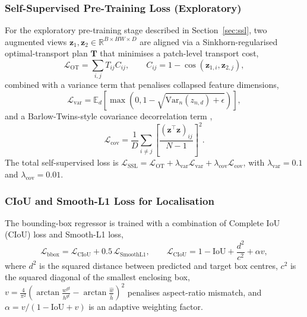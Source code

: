 \documentclass[preprint,12pt,authoryear]{elsarticle}
\begin{document}
\subsubsection{Self-Supervised Pre-Training Loss (Exploratory)}
\label{sec:loss-ssl}

For the exploratory pre-training stage described in Section~\ref{sec:ssl}, two augmented views $\mathbf{z}_1, \mathbf{z}_2 \in \mathbb{R}^{B\times HW \times D}$ are aligned via a Sinkhorn-regularised optimal-transport plan $\mathbf{T}$ that minimises a patch-level transport cost,
\begin{equation}
\mathcal{L}_{\text{OT}} = \sum_{i,j} T_{ij} C_{ij}, \qquad C_{ij} = 1 - \cos\!\left(\mathbf{z}_{1,i}, \mathbf{z}_{2,j}\right),
\end{equation}
combined with a variance term that penalises collapsed feature dimensions,
\begin{equation}
\mathcal{L}_{\text{var}} = \mathbb{E}_d\left[\max\!\left(0, 1-\sqrt{\mathrm{Var}_n(z_{n,d}) + \epsilon}\right)\right],
\end{equation}
and a Barlow-Twins-style covariance decorrelation term \citep{barlow_twins},
\begin{equation}
\mathcal{L}_{\text{cov}} = \frac{1}{D}\sum_{i\neq j}\left[\frac{(\mathbf{z}^\top \mathbf{z})_{ij}}{N-1}\right]^2.
\end{equation}
The total self-supervised loss is $\mathcal{L}_{\text{SSL}} = \mathcal{L}_{\text{OT}} + \lambda_{\text{var}}\mathcal{L}_{\text{var}} + \lambda_{\text{cov}}\mathcal{L}_{\text{cov}}$, with $\lambda_{\text{var}}=0.1$ and $\lambda_{\text{cov}}=0.01$.

\subsubsection{CIoU and Smooth-L1 Loss for Localisation}

The bounding-box regressor is trained with a combination of Complete IoU (CIoU) loss and Smooth-L1 loss,
\begin{equation}
\mathcal{L}_{\text{bbox}} = \mathcal{L}_{\text{CIoU}} + 0.5\,\mathcal{L}_{\text{SmoothL1}}, \qquad
\mathcal{L}_{\text{CIoU}} = 1 - \text{IoU} + \frac{d^2}{c^2} + \alpha v,
\end{equation}
where $d^2$ is the squared distance between predicted and target box centres, $c^2$ is the squared diagonal of the smallest enclosing box, $v = \frac{4}{\pi^2}\left(\arctan\frac{w^{gt}}{h^{gt}} - \arctan\frac{\hat{w}}{\hat{h}}\right)^2$ penalises aspect-ratio mismatch, and $\alpha = v/(1-\text{IoU}+v)$ is an adaptive weighting factor.
\end{document}
